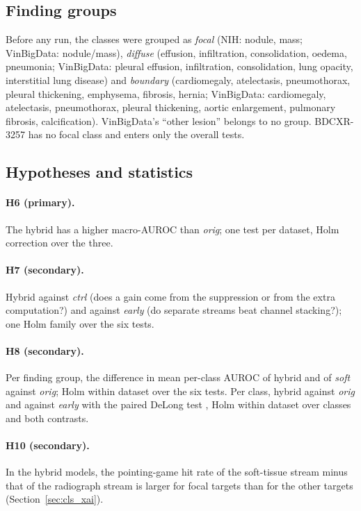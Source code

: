 \subsection{Finding groups}
Before any run, the classes were grouped as \emph{focal} (NIH: nodule, mass; VinBigData: nodule/mass), \emph{diffuse} (effusion,
infiltration, consolidation, oedema, pneumonia; VinBigData: pleural effusion, infiltration, consolidation, lung opacity, interstitial lung
disease) and \emph{boundary} (cardiomegaly, atelectasis, pneumothorax, pleural thickening, emphysema, fibrosis, hernia; VinBigData:
cardiomegaly, atelectasis, pneumothorax, pleural thickening, aortic enlargement, pulmonary fibrosis, calcification). VinBigData's
``other lesion'' belongs to no group. BDCXR-3257 has no focal class and enters only the overall tests.

\subsection{Hypotheses and statistics}
\label{sec:cls_stats}
\paragraph{H6 (primary).} The hybrid has a higher macro-AUROC than \emph{orig}; one test per dataset, Holm correction over the three.
\paragraph{H7 (secondary).} Hybrid against \emph{ctrl} (does a gain come from the suppression or from the extra computation?) and against
\emph{early} (do separate streams beat channel stacking?); one Holm family over the six tests.
\paragraph{H8 (secondary).} Per finding group, the difference in mean per-class AUROC of hybrid and of \emph{soft} against \emph{orig};
Holm within dataset over the six tests. Per class, hybrid against \emph{orig} and against \emph{early} with the paired DeLong test
\citep{delong1988auc}, Holm within dataset over classes and both contrasts.
\paragraph{H10 (secondary).} In the hybrid models, the pointing-game hit rate of the soft-tissue stream minus that of the radiograph stream
is larger for focal targets than for the other targets (Section~\ref{sec:cls_xai}).

